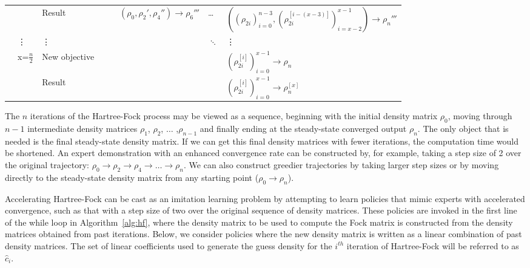 \documentclass[twoside,11pt]{article}
\begin{document}
\begin{center}
\begin{table}[t]
{\begin{tabular}{|l|l|l|l|l|l|l|l|}
	&                 & Result &                 &                 & $(\rho_0,\rho_2',\rho_4'')  \rightarrow \rho_6'''$ &  \ldots & $((\rho_{2i})_{i=0}^{n-3} ,(\rho_{2i}^{[i-(x-3)]})_{i=x-2}^{x-1})\rightarrow \rho_{n}'''$      \\ \cline{2-8} 
	& \vdots      & \vdots      &                &                &                & $\ddots$ &   \vdots \\ \cline{2-8} 
	& \multirow{2}{*}{ x=$\frac{n}{2}$} & New objective         &                         &                          &                            &  & $(\rho_{2i}^{[i]})_{i=0}^{x-1} \rightarrow \rho_{n}$     \\ \cline{3-8} 
	&                & Result  &                &                &                &  & $(\rho_{2i}^{[i]})_{i=0}^{x-1}\rightarrow \rho_{n}^{[x]}$ \\ \hline
	\end{tabular}}
	\label{tab:DAgger}
	\end{table}
\end{center} 

The $n$ iterations of the Hartree-Fock process may be viewed as a sequence, beginning with the initial density matrix $\rho_0$, moving through $n-1$ intermediate density matrices $\rho_1$,  $\rho_2$,  $\ldots$ ,$\rho_{n-1}$ and finally ending at the steady-state converged output $\rho_{n}$. The only object that is needed is the final steady-state density matrix. If we can get this final density matrices with fewer iterations, the computation time would be shortened. An expert demonstration with an enhanced convergence rate can be constructed by, for example, taking a step size of 2 over the original trajectory: $\rho_0 \rightarrow \rho_2 \rightarrow  \rho_4 \rightarrow  \ldots \rightarrow  \rho_{n}$. We can also construct greedier trajectories by taking larger step sizes or by moving directly to the steady-state density matrix from any starting point ($\rho_0 \rightarrow \rho_{n}$). 

Accelerating Hartree-Fock can be cast as an imitation learning problem by attempting to learn policies that mimic experts with accelerated convergence, such as that with a step size of two over the original sequence of density matrices. These policies are invoked in the first line of the while loop in Algorithm~\ref{alg:hf}, where the density matrix to be used to compute the Fock matrix is constructed from the density matrices obtained from past iterations. Below, we consider policies where the new density matrix is written as a linear combination of past density matrices. The set of linear coefficients used to generate the guess density for the $i^{th}$ iteration of Hartree-Fock will be referred to as $\hat{c}_i$.
\end{document}

